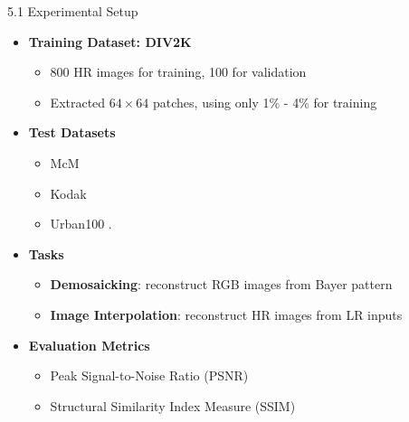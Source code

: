 \documentclass[aspectratio=169,xcolor=dvipsnames]{beamer}
\begin{document}
\begin{frame}{5.1 Experimental Setup}

\begin{itemize}
    \item \textbf{Training Dataset: DIV2K}
    \begin{itemize}
        \item 800 HR images for training, 100 for validation
        \item Extracted $64 \times 64$ patches, using only 1\% - 4\% for training
    \end{itemize}
    
    \item \textbf{Test Datasets}
    \begin{itemize}
        \item McM \cite{zhang2011color}
        \item Kodak  \cite{kodak1993} 
        \item Urban100 \cite{huang2015single}.
    \end{itemize}
    
    \item \textbf{Tasks}
    \begin{itemize}
        \item \textbf{Demosaicking}: reconstruct RGB images from Bayer pattern
        \item \textbf{Image Interpolation}: reconstruct HR images from LR inputs
    \end{itemize}
    
    \item \textbf{Evaluation Metrics}
    \begin{itemize}
        \item Peak Signal-to-Noise Ratio (PSNR)
        \item Structural Similarity Index Measure (SSIM) \cite{wang2004image}
    \end{itemize}
    
\end{itemize}

\end{frame}

\end{document}
